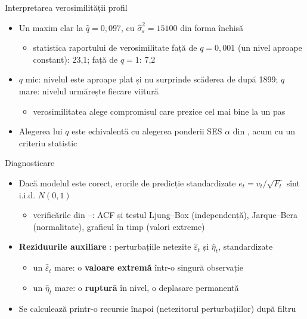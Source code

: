 \begin{frame}{Interpretarea verosimilității profil}
\itemsize{\small}
\begin{itemize}
    \item Un maxim clar la $\hat q = 0{,}097$, cu $\hat\sigma^2_\varepsilon = 15100$ din forma închisă
    \begin{itemize}
        \item statistica raportului de verosimilitate față de $q = 0{,}001$ (un nivel aproape constant): 23{,}1; față de $q = 1$: 7{,}2
    \end{itemize}
    \item $q$ mic: nivelul este aproape plat și nu surprinde scăderea de după 1899; $q$ mare: nivelul urmărește fiecare viitură
    \begin{itemize}
        \item verosimilitatea alege compromisul care prezice cel mai bine la un pas
    \end{itemize}
    \item Alegerea lui $q$ este echivalentă cu alegerea ponderii SES $\alpha$ din , acum cu un criteriu statistic
\end{itemize}
\end{frame}

\begin{frame}{Diagnosticare}
\itemsize{\small}
\begin{itemize}
    \item Dacă modelul este corect, erorile de predicție standardizate $e_t = v_t/\sqrt{F_t}$ sînt i.i.d. $N(0, 1)$
    \begin{itemize}
        \item verificările din --: ACF și testul Ljung--Box (independență), Jarque--Bera (normalitate), graficul în timp (valori extreme)
    \end{itemize}
    \item \textbf{Reziduurile auxiliare} : perturbațiile netezite $\hat\varepsilon_t$ și $\hat\eta_t$, standardizate
    \begin{itemize}
        \item un $\hat\varepsilon_t$ mare: o \textbf{valoare extremă} într-o singură observație
        \item un $\hat\eta_t$ mare: o \textbf{ruptură} în nivel, o deplasare permanentă
    \end{itemize}
    \item Se calculează printr-o recursie înapoi (netezitorul perturbațiilor) după filtru
\end{itemize}
\end{frame}

